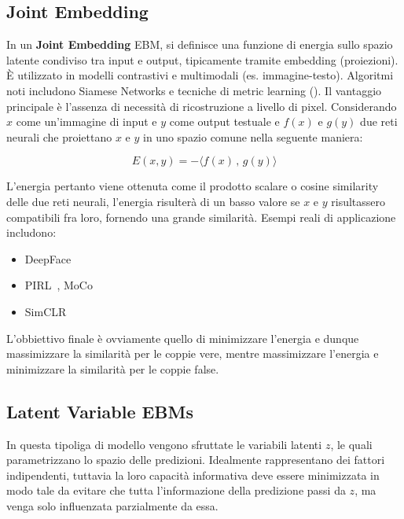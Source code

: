 \subsection{Joint Embedding}

In un \textbf{Joint Embedding} EBM, si definisce una funzione di energia sullo spazio latente condiviso tra input e output, tipicamente tramite embedding (proiezioni). È utilizzato in modelli contrastivi e multimodali (es. immagine-testo). Algoritmi noti includono Siamese Networks e tecniche di metric learning (\cite{bromley1993signature, chopra2005learning, hadsell2006dimensionality}). Il vantaggio principale è l'assenza di necessità di ricostruzione a livello di pixel. Considerando $x$ come un'immagine di input e $y$ come output testuale e $f(x)$ e $g(y)$ due reti neurali che proiettano $x$ e $y$ in uno spazio comune nella seguente maniera:

\begin{equation}
    E(x,y) = - \langle f(x)\,,\,g(y)\rangle
\end{equation}

L'energia pertanto viene ottenuta come il prodotto scalare o cosine similarity delle due reti neurali, l'energia risulterà di un basso valore se $x$ e $y$ risultassero compatibili fra loro, fornendo una grande similarità. Esempi reali di applicazione includono:
\begin{itemize}
    \item DeepFace~\cite{taigman2014deepface}
    \item PIRL~\cite{misra2019pirl}, MoCo~\cite{he2019moco}
    \item SimCLR~\cite{chen2020simclr}
\end{itemize}

L'obbiettivo finale è ovviamente quello di minimizzare l'energia e dunque massimizzare la similarità per le coppie vere, mentre massimizzare l'energia e minimizzare la similarità per le coppie false.

\subsection{Latent Variable EBMs}
In questa tipoliga di modello vengono sfruttate le variabili latenti $z$, le quali parametrizzano lo spazio delle predizioni. Idealmente rappresentano dei fattori indipendenti, tuttavia la loro capacità informativa deve essere minimizzata in modo tale da evitare che tutta l'informazione della predizione passi da $z$, ma venga solo influenzata parzialmente da essa.

